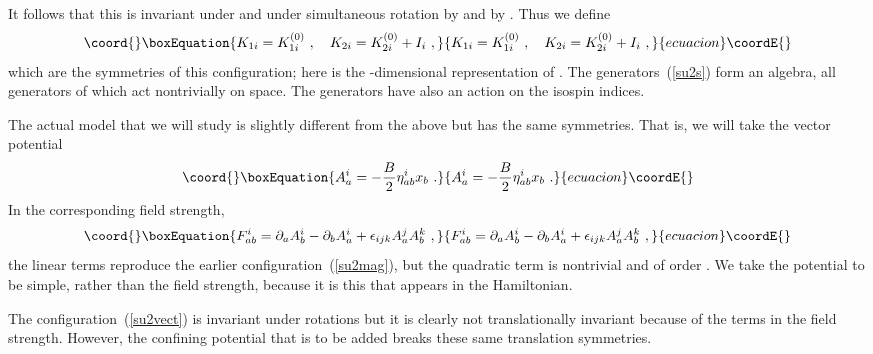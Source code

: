\documentclass[a4paper,12pt]{article}
\begin{document}
It follows that this is invariant under \coordHE{} and under
simultaneous rotation by \coordHE{} and by \coordHE{}.  Thus we
define~\cite{hz1}
\begin{equation}\coord{}\boxEquation{
K_{1i} = K_{1i}^{(0)}\ , \quad
K_{2i} = K_{2i}^{(0)} + I_{i}\ , \label{su2s}
}{
K_{1i} = K_{1i}^{(0)}\ , \quad
K_{2i} = K_{2i}^{(0)} + I_{i}\ , }{ecuacion}\coordE{}\end{equation}
which are the symmetries of this configuration; here \coordHE{} is the
\coordHE{}-dimensional representation of \coordHE{}.  The
generators~(\ref{su2s}) form an
\coordHE{} algebra, all generators of which act nontrivially on
space.  The generators \coordHE{} have also an action on the \coordHE{} isospin
indices.

The actual model that we will study is slightly different from the above
but has the same symmetries.  That is, we will take the vector potential
\begin{equation}\coord{}\boxEquation{
A^i_a = -\frac{B}{2} \eta^i_{ab} x_b\ . \label{su2vect}
}{
A^i_a = -\frac{B}{2} \eta^i_{ab} x_b\ . }{ecuacion}\coordE{}\end{equation}
In the corresponding field strength, 
\begin{equation}\coord{}\boxEquation{
F^i_{ab} = \partial_a A^i_b - \partial_b A^i_a 
+ \epsilon_{ijk} A^j_a A^k_b
\ , 
}{
F^i_{ab} = \partial_a A^i_b - \partial_b A^i_a 
+ \epsilon_{ijk} A^j_a A^k_b
\ , 
}{ecuacion}\coordE{}\end{equation}
the linear terms reproduce the earlier configuration~(\ref{su2mag}), but
the quadratic term is nontrivial and of order \coordHE{}.  We take the
potential to be simple, rather than the field strength, because it is this
that appears in the Hamiltonian.

The configuration~(\ref{su2vect}) is invariant under \coordHE{} rotations but
it is clearly not translationally invariant because of the \coordHE{} terms
in the field strength.  However, the
confining potential that is to be added breaks these same
translation symmetries.  
\end{document}
